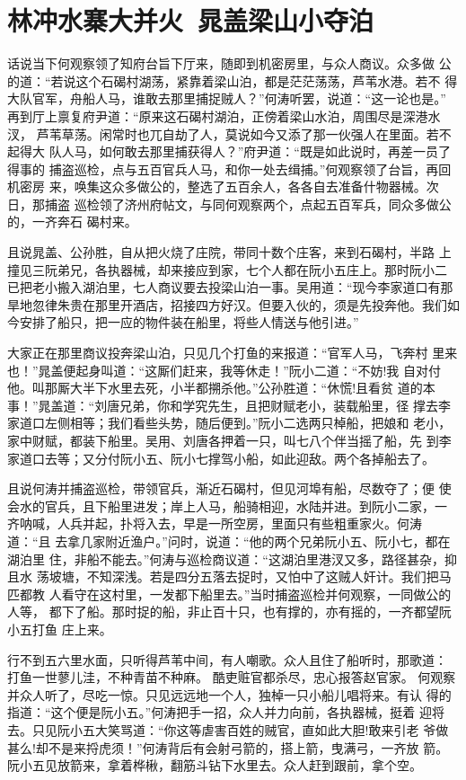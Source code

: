 \chapter{林冲水寨大并火~晁盖梁山小夺泊}

话说当下何观察领了知府台旨下厅来，随即到机密房里，与众人商议。众多做
公的道：“若说这个石碣村湖荡，紧靠着梁山泊，都是茫茫荡荡，芦苇水港。若不
得大队官军，舟船人马，谁敢去那里捕捉贼人？”何涛听罢，说道：“这一论也是。”
再到厅上禀复府尹道：“原来这石碣村湖泊，正傍着梁山水泊，周围尽是深港水汊，
芦苇草荡。闲常时也兀自劫了人，莫说如今又添了那一伙强人在里面。若不起得大
队人马，如何敢去那里捕获得人？”府尹道：“既是如此说时，再差一员了得事的
捕盗巡检，点与五百官兵人马，和你一处去缉捕。”何观察领了台旨，再回机密房
来，唤集这众多做公的，整选了五百余人，各各自去准备什物器械。次日，那捕盗
巡检领了济州府帖文，与同何观察两个，点起五百军兵，同众多做公的，一齐奔石
碣村来。

且说晁盖、公孙胜，自从把火烧了庄院，带同十数个庄客，来到石碣村，半路
上撞见三阮弟兄，各执器械，却来接应到家，七个人都在阮小五庄上。那时阮小二
已把老小搬入湖泊里，七人商议要去投梁山泊一事。吴用道：“现今李家道口有那
旱地忽律朱贵在那里开酒店，招接四方好汉。但要入伙的，须是先投奔他。我们如
今安排了船只，把一应的物件装在船里，将些人情送与他引进。”

大家正在那里商议投奔梁山泊，只见几个打鱼的来报道：“官军人马，飞奔村
里来也！”晁盖便起身叫道：“这厮们赶来，我等休走！”阮小二道：“不妨!我
自对付他。叫那厮大半下水里去死，小半都搠杀他。”公孙胜道：“休慌!且看贫
道的本事！”晁盖道：“刘唐兄弟，你和学究先生，且把财赋老小，装载船里，径
撑去李家道口左侧相等；我们看些头势，随后便到。”阮小二选两只棹船，把娘和
老小，家中财赋，都装下船里。吴用、刘唐各押着一只，叫七八个伴当摇了船，先
到李家道口去等；又分付阮小五、阮小七撑驾小船，如此迎敌。两个各掉船去了。

且说何涛并捕盗巡检，带领官兵，渐近石碣村，但见河埠有船，尽数夺了；便
使会水的官兵，且下船里进发；岸上人马，船骑相迎，水陆并进。到阮小二家，一
齐呐喊，人兵并起，扑将入去，早是一所空房，里面只有些粗重家火。何涛道：“且
去拿几家附近渔户。”问时，说道：“他的两个兄弟阮小五、阮小七，都在湖泊里
住，非船不能去。”何涛与巡检商议道：“这湖泊里港汊又多，路径甚杂，抑且水
荡坡塘，不知深浅。若是四分五落去捉时，又怕中了这贼人奸计。我们把马匹都教
人看守在这村里，一发都下船里去。”当时捕盗巡检并何观察，一同做公的人等，
都下了船。那时捉的船，非止百十只，也有撑的，亦有摇的，一齐都望阮小五打鱼
庄上来。

行不到五六里水面，只听得芦苇中间，有人嘲歌。众人且住了船听时，那歌道：
打鱼一世蓼儿洼，不种青苗不种麻。
酷吏赃官都杀尽，忠心报答赵官家。
何观察并众人听了，尽吃一惊。只见远远地一个人，独棹一只小船儿唱将来。有认
得的指道：“这个便是阮小五。”何涛把手一招，众人并力向前，各执器械，挺着
迎将去。只见阮小五大笑骂道：“你这等虐害百姓的贼官，直如此大胆!敢来引老
爷做甚么!却不是来捋虎须！”何涛背后有会射弓箭的，搭上箭，曳满弓，一齐放
箭。阮小五见放箭来，拿着桦楸，翻筋斗钻下水里去。众人赶到跟前，拿个空。

